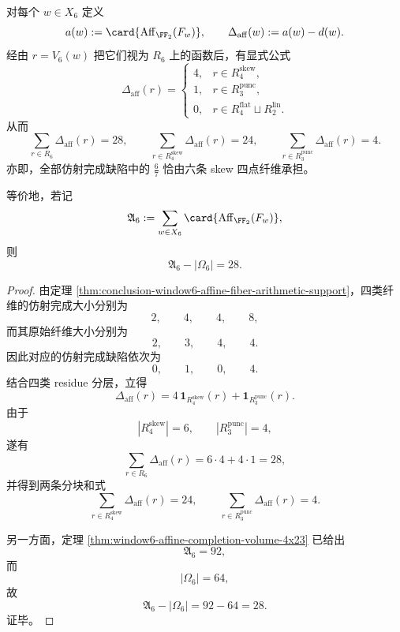 \begin{proposition}\label{prop:conclusion-window6-affine-completion-defect-law}
对每个 \(w\in X_6\) 定义
\[
a(w):=\card{\operatorname{Aff}_{\FF_2}(F_w)},
\qquad
\Delta_{\mathrm{aff}}(w):=a(w)-d(w).
\]
经由 \(r=V_6(w)\) 把它们视为 \(R_6\) 上的函数后，有显式公式
\[
\Delta_{\mathrm{aff}}(r)=
\begin{cases}
4,& r\in R_{4}^{\mathrm{skew}},\\[2pt]
1,& r\in R_{3}^{\mathrm{punc}},\\[2pt]
0,& r\in R_{4}^{\mathrm{flat}}\sqcup R_{2}^{\mathrm{lin}}.
\end{cases}
\]
从而
\[
\sum_{r\in R_6}\Delta_{\mathrm{aff}}(r)=28,
\qquad
\sum_{r\in R_{4}^{\mathrm{skew}}}\Delta_{\mathrm{aff}}(r)=24,
\qquad
\sum_{r\in R_{3}^{\mathrm{punc}}}\Delta_{\mathrm{aff}}(r)=4.
\]
亦即，全部仿射完成缺陷中的 \(\frac67\) 恰由六条 skew 四点纤维承担。

等价地，若记
\[
\mathfrak A_6:=\sum_{w\in X_6}\card{\operatorname{Aff}_{\FF_2}(F_w)},
\]
则
\[
\mathfrak A_6-|\Omega_6|=28.
\]
\end{proposition}
\begin{proof}
由定理 \ref{thm:conclusion-window6-affine-fiber-arithmetic-support}，四类纤维的仿射完成大小分别为
\[
2,\qquad 4,\qquad 4,\qquad 8,
\]
而其原始纤维大小分别为
\[
2,\qquad 3,\qquad 4,\qquad 4.
\]
因此对应的仿射完成缺陷依次为
\[
0,\qquad 1,\qquad 0,\qquad 4.
\]
结合四类 residue 分层，立得
\[
\Delta_{\mathrm{aff}}(r)=4\,\mathbf 1_{R_{4}^{\mathrm{skew}}}(r)+\mathbf 1_{R_{3}^{\mathrm{punc}}}(r).
\]
由于
\[
|R_{4}^{\mathrm{skew}}|=6,
\qquad
|R_{3}^{\mathrm{punc}}|=4,
\]
遂有
\[
\sum_{r\in R_6}\Delta_{\mathrm{aff}}(r)=6\cdot 4+4\cdot 1=28,
\]
并得到两条分块和式
\[
\sum_{r\in R_{4}^{\mathrm{skew}}}\Delta_{\mathrm{aff}}(r)=24,
\qquad
\sum_{r\in R_{3}^{\mathrm{punc}}}\Delta_{\mathrm{aff}}(r)=4.
\]

另一方面，定理 \ref{thm:window6-affine-completion-volume-4x23} 已给出
\[
\mathfrak A_6=92,
\]
而
\[
|\Omega_6|=64,
\]
故
\[
\mathfrak A_6-|\Omega_6|=92-64=28.
\]
证毕。
\end{proof}

